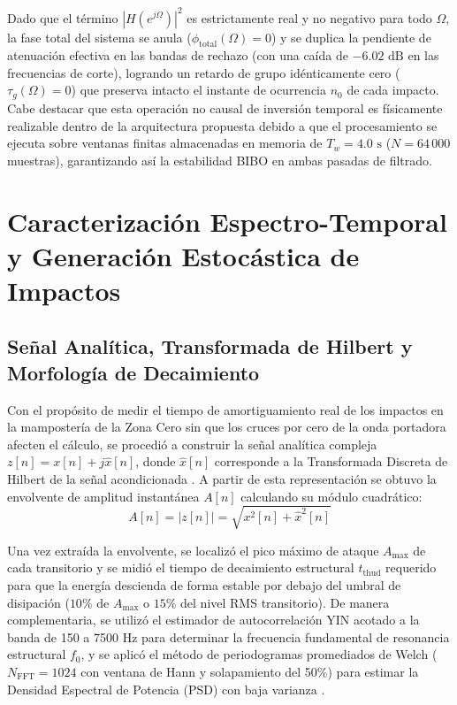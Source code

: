 \documentclass[journal, a4paper]{IEEEtran}
\begin{document}
Dado que el término $|H(e^{j\Omega})|^2$ es estrictamente real y no negativo para todo $\Omega$, la fase total del sistema se anula ($\phi_{\text{total}}(\Omega) = 0$) y se duplica la pendiente de atenuación efectiva en las bandas de rechazo (con una caída de $-6.02\text{ dB}$ en las frecuencias de corte), logrando un retardo de grupo idénticamente cero ($\tau_g(\Omega) = 0$) que preserva intacto el instante de ocurrencia $n_0$ de cada impacto. Cabe destacar que esta operación no causal de inversión temporal es físicamente realizable dentro de la arquitectura propuesta debido a que el procesamiento se ejecuta sobre ventanas finitas almacenadas en memoria de $T_w = 4.0\text{ s}$ ($N = 64\,000$ muestras), garantizando así la estabilidad BIBO en ambas pasadas de filtrado.

\section{Caracterización Espectro-Temporal y Generación Estocástica de Impactos}

\subsection{Señal Analítica, Transformada de Hilbert y Morfología de Decaimiento}
Con el propósito de medir el tiempo de amortiguamiento real de los impactos en la mampostería de la Zona Cero sin que los cruces por cero de la onda portadora afecten el cálculo, se procedió a construir la señal analítica compleja $z[n] = x[n] + j\hat{x}[n]$, donde $\hat{x}[n]$ corresponde a la Transformada Discreta de Hilbert de la señal acondicionada \cite{Oppenheim}. A partir de esta representación se obtuvo la envolvente de amplitud instantánea $A[n]$ calculando su módulo cuadrático:
\begin{equation}
    A[n] = |z[n]| = \sqrt{x^2[n] + \hat{x}^2[n]}
\end{equation}

Una vez extraída la envolvente, se localizó el pico máximo de ataque $A_{\max}$ de cada transitorio y se midió el tiempo de decaimiento estructural $t_{\text{thud}}$ requerido para que la energía descienda de forma estable por debajo del umbral de disipación ($10\%$ de $A_{\max}$ o $15\%$ del nivel RMS transitorio). De manera complementaria, se utilizó el estimador de autocorrelación YIN acotado a la banda de 150 a 7500 Hz para determinar la frecuencia fundamental de resonancia estructural $f_0$, y se aplicó el método de periodogramas promediados de Welch ($N_{\text{FFT}} = 1024$ con ventana de Hann y solapamiento del 50\%) para estimar la Densidad Espectral de Potencia (PSD) con baja varianza \cite{Proakis}.
\end{document}
